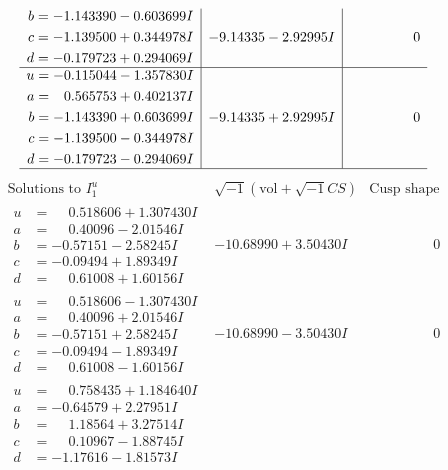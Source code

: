 \documentclass[1p]{elsarticle_modified}
\theoremstyle{definition}
\newcommand{\I}{\sqrt{-1}}
\begin{document}
$$\begin{array}{c|c|c}
\begin{aligned}
b &= -1.143390 - 0.603699 I \\
c &= -1.139500 + 0.344978 I \\
d &= -0.179723 + 0.294069 I\end{aligned}
 & -9.14335 - 2.92995 I & \phantom{-0.000000 } 0 \\ \hline\begin{aligned}
u &= -0.115044 - 1.357830 I \\
a &= \phantom{-}0.565753 + 0.402137 I \\
b &= -1.143390 + 0.603699 I \\
c &= -1.139500 - 0.344978 I \\
d &= -0.179723 - 0.294069 I\end{aligned}
 & -9.14335 + 2.92995 I & \phantom{-0.000000 } 0\\
 \hline 
 \end{array}$$\newpage$$\begin{array}{c|c|c}  
\text{Solutions to }I^u_{1}& \I (\text{vol} + \sqrt{-1}CS) & \text{Cusp shape}\\
 \hline 
\begin{aligned}
u &= \phantom{-}0.518606 + 1.307430 I \\
a &= \phantom{-}0.40096 - 2.01546 I \\
b &= -0.57151 - 2.58245 I \\
c &= -0.09494 + 1.89349 I \\
d &= \phantom{-}0.61008 + 1.60156 I\end{aligned}
 & -10.68990 + 3.50430 I & \phantom{-0.000000 } 0 \\ \hline\begin{aligned}
u &= \phantom{-}0.518606 - 1.307430 I \\
a &= \phantom{-}0.40096 + 2.01546 I \\
b &= -0.57151 + 2.58245 I \\
c &= -0.09494 - 1.89349 I \\
d &= \phantom{-}0.61008 - 1.60156 I\end{aligned}
 & -10.68990 - 3.50430 I & \phantom{-0.000000 } 0 \\ \hline\begin{aligned}
u &= \phantom{-}0.758435 + 1.184640 I \\
a &= -0.64579 + 2.27951 I \\
b &= \phantom{-}1.18564 + 3.27514 I \\
c &= \phantom{-}0.10967 - 1.88745 I \\
d &= -1.17616 - 1.81573 I\end{aligned}

\end{array}$$
\end{document}
